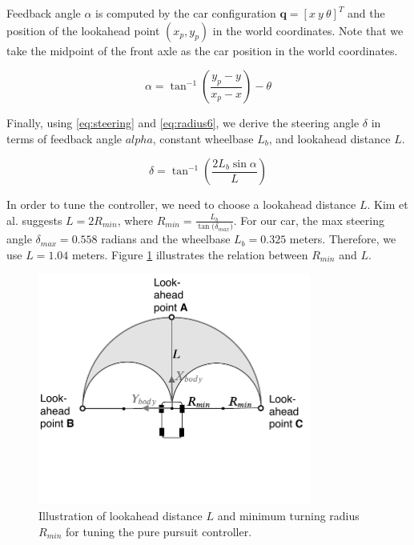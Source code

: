 Feedback angle $\alpha$ is computed by the car configuration $\textbf{q} = [x\
y\ \theta]^T$ and the position of the lookahead point $(x_p, y_p)$ in the world
coordinates. Note that we take the midpoint of the front axle as the car
position in the world coordinates.

\begin{equation}
  \alpha = \tan^{-1}(\frac{y_p - y}{x_p - x}) - \theta
  \label{eq:alpha}
\end{equation}

Finally, using \eqref{eq:steering} and \eqref{eq:radius6}, we derive the
steering angle $\delta$ in terms of feedback angle $alpha$, constant wheelbase
$L_b$, and lookahead distance $L$.

\begin{equation}
  \delta = \tan^{-1}(\frac{2L_b\sin\alpha}{L})
  \label{eq:delta}
\end{equation}

In order to tune the controller, we need to choose a lookahead distance $L$.
Kim et al. \cite{Kim2013SensorbasedMP} suggests $L = 2R_{min}$, where $R_{min}
= \frac{L_b}{\tan({\delta_{max})}}$. For our car, the max steering angle
$\delta_{max} = 0.558$ radians and the wheelbase $L_b = 0.325$ meters.
Therefore, we use $L = 1.04$ meters. Figure \ref{figure:lookahead} illustrates
the relation between $R_{min}$ and $L$.

\begin{figure}[h]
  \centering
  \includegraphics[width=0.8\textwidth]{figures/pure-pursuit-lookahead.pdf}
  \caption[Pure pursuit controller tuning]{Illustration of lookahead distance
  $L$ and minimum turning radius $R_{min}$ for tuning the pure pursuit
  controller.}
  \label{figure:lookahead}
\end{figure}

